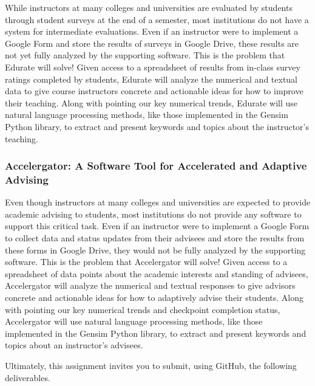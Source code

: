 \documentclass[11pt]{article}
\begin{document}
While instructors at many colleges and universities are evaluated by students through student surveys at the end of a
semester, most institutions do not have a system for intermediate evaluations. Even if an instructor were to implement a
Google Form and store the results of surveys in Google Drive, these results are not yet fully analyzed by the supporting
software. This is the problem that Edurate will solve! Given access to a spreadsheet of results from in-class survey
ratings completed by students, Edurate will analyze the numerical and textual data to give course instructors concrete
and actionable ideas for how to improve their teaching. Along with pointing our key numerical trends, Edurate will use
natural language processing methods, like those implemented in the Gensim Python library, to extract and present
keywords and topics about the instructor's teaching.

\vspace*{-.5em}

\subsubsection*{Accelergator: A Software Tool for Accelerated and Adaptive Advising}

Even though instructors at many colleges and universities are expected to provide academic advising to students, most
institutions do not provide any software to support this critical task. Even if an instructor were to implement a Google
Form to collect data and status updates from their advisees and store the results from these forms in Google Drive, they
would not be fully analyzed by the supporting software. This is the problem that Accelergator will solve! Given access
to a spreadsheet of data points about the academic interests and standing of advisees, Accelergator will analyze the
numerical and textual responses to give advisors concrete and actionable ideas for how to adaptively advise their
students. Along with pointing our key numerical trends and checkpoint completion status, Accelergator will use natural
language processing methods, like those implemented in the Gensim Python library, to extract and present keywords and
topics about an instructor's advisees.

Ultimately, this assignment invites you to submit, using GitHub, the following deliverables.

\vspace*{-.5em}
\end{document}
